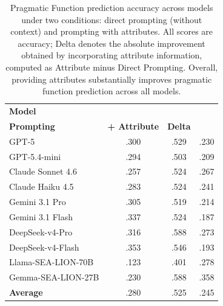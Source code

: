 \documentclass[11pt]{article}
\begin{document}
\begin{table}[t]
    \centering
    \footnotesize
    \renewcommand{\arraystretch}{1.15}
    \setlength{\tabcolsep}{3pt}
    \begin{tabular}{lccc}
        \toprule
        \textbf{Model} & \shortstack{\textbf{Direct} \\ \textbf{Prompting}}  & \textbf{+ Attribute} & \textbf{Delta} \\
        \midrule
        GPT-5 & .300 & .529 & .230 \\
        GPT-5.4-mini & .294 & .503 & .209 \\
        Claude Sonnet 4.6 & .257 & .524 & .267 \\
        Claude Haiku 4.5 & .283 & .524 & .241 \\
        Gemini 3.1 Pro & .305 & .519 & .214 \\
        Gemini 3.1 Flash & .337 & .524 & .187 \\
        DeepSeek-v4-Pro & .316 & .588 & .273 \\
        DeepSeek-v4-Flash & .353 & .546 & .193 \\
        \midrule
        Llama-SEA-LION-70B & .123 & .401 & .278 \\
        Gemma-SEA-LION-27B & .230 & .588 & .358 \\
        \midrule
        \textbf{Average} & .280 & .525 & .245 \\
        \bottomrule
    \end{tabular}

    \caption{Pragmatic Function prediction accuracy across models under two conditions: direct prompting (without context) and prompting with attributes. All scores are accuracy; Delta denotes the absolute improvement obtained by incorporating attribute information, computed as Attribute minus Direct Prompting. Overall, providing attributes substantially improves pragmatic function prediction across all models.}
    \label{tab:task-1b-1c-macro-function-accuracy}
\end{table}
\end{document}
